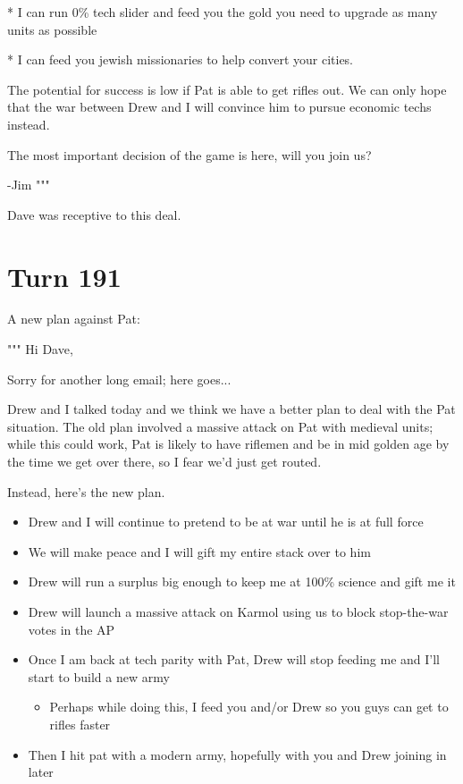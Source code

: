 \documentclass[10pt]{article}
\begin{document}
* I can run 0\% tech slider and feed you the gold you need to upgrade
as many units as possible

* I can feed you jewish missionaries to help convert your cities.

The potential for success is low if Pat is able to get rifles out. We
can only hope that the war between Drew and I will convince him to
pursue economic techs instead.

The most important decision of the game is here, will you join us?

-Jim
"""

Dave was receptive to this deal.

\section*{Turn 191}

A new plan against Pat:

"""
Hi Dave,

Sorry for another long email; here goes...

Drew and I talked today and we think we have a better plan to deal
with the Pat situation. The old plan involved a massive attack on Pat
with medieval units; while this could work, Pat is likely to have
riflemen and be in mid golden age by the time we get over there, so I
fear we'd just get routed.

Instead, here's the new plan.
\begin{itemize}
\item Drew and I will continue to pretend to be at war until he is at full force
\item We will make peace and I will gift my entire stack over to him
\item Drew will run a surplus big enough to keep me at 100\% science and gift me it
\item Drew will launch a massive attack on Karmol using us to block stop-the-war votes in the AP
\item Once I am back at tech parity with Pat, Drew will stop feeding me and I'll start to build a new army
\begin{itemize}
  \item Perhaps while doing this, I feed you and/or Drew so you guys can get to rifles faster
\end{itemize}
\item Then I hit pat with a modern army, hopefully with you and Drew joining in later
\end{itemize}
\end{document}
